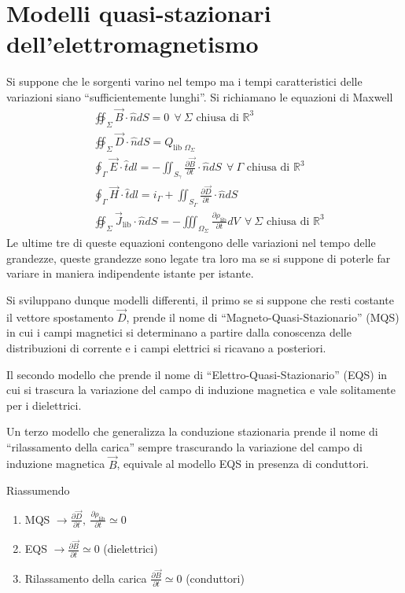 \section{Modelli quasi-stazionari dell'elettromagnetismo}
Si suppone che le sorgenti varino nel tempo ma i tempi caratteristici delle variazioni
siano ``sufficientemente lunghi''.
Si richiamano le equazioni di Maxwell
$$
\begin{aligned}
&\oiint_\Sigma\vec{B}\cdot\hat{n}dS = 0\ \ \forall\ \Sigma \text{ chiusa di } \mathbb{R}^3\\
&\oiint_\Sigma\vec{D}\cdot\hat{n}dS = Q_{\text{lib }\Omega_\Sigma} \\
&\oint_\Gamma \vec{E}\cdot\hat{t} dl = - \iint_{S_\gamma} \frac{\partial\vec{B}}{\partial t}\cdot\hat{n}dS \ \ \forall\ \Gamma \text{ chiusa di } \mathbb{R}^3\\
&\oint_\Gamma \vec{H}\cdot\hat{t}dl = i_\Gamma + \iint_{S_\Gamma} \frac{\partial\vec{D}}{\partial t}\cdot\hat{n} dS\\
&\oiint_\Sigma \vec{J}_\text{lib} \cdot\hat{n}dS = - \iiint_{\Omega_\Sigma} \frac{\partial \rho_\text{lib}}{\partial t}dV\ \ \forall\ \Sigma \text{ chiusa di }\mathbb{R}^3
\end{aligned}
$$
Le ultime tre di queste equazioni contengono delle variazioni nel tempo delle grandezze, queste
grandezze sono legate tra loro ma se si suppone di poterle far variare
in maniera indipendente istante per istante. 

Si sviluppano dunque modelli differenti, il primo
se si suppone che resti costante il vettore spostamento $\vec{D}$, prende il nome
di ``Magneto-Quasi-Stazionario'' (MQS) in cui i campi magnetici si determinano a partire dalla
conoscenza delle distribuzioni di corrente e i campi elettrici si ricavano a posteriori.

Il secondo modello che prende il nome di ``Elettro-Quasi-Stazionario'' (EQS) in cui si 
trascura la variazione del campo di induzione magnetica e vale solitamente per i 
dielettrici.

Un terzo modello che generalizza la conduzione stazionaria prende il nome di
``rilassamento della carica'' sempre trascurando la variazione del campo di induzione
magnetica $\vec{B}$, equivale al modello EQS in presenza di conduttori.

Riassumendo
\begin{enumerate}
\item MQS $\rightarrow \frac{\partial\vec{D}}{\partial t},\ \frac{\partial \rho_\text{lib}}{\partial t} \simeq 0$
\item EQS $\rightarrow\frac{\partial\vec{B}}{\partial t} \simeq 0 $ (dielettrici)
\item Rilassamento della carica $\frac{\partial\vec{B}}{\partial t} \simeq 0$ (conduttori)
\end{enumerate}

